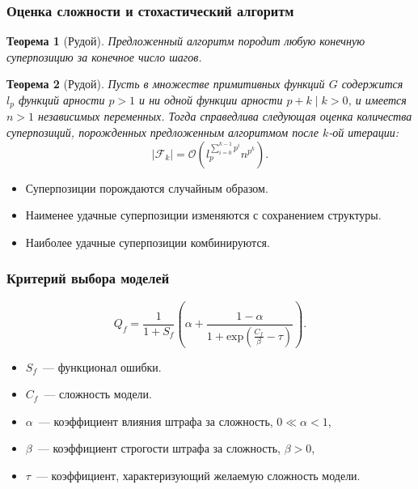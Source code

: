 \documentclass{beamer}
\newtheorem{theo}{Теорема}
\begin{document}
\begin{frame}
  \frametitle{Оценка сложности и стохастический алгоритм}
  
  \begin{theo}[Рудой]
	Предложенный алгоритм породит любую конечную суперпозицию за конечное число шагов.
  \end{theo}

  \begin{theo}[Рудой]
	Пусть в множестве примитивных функций $G$ содержится $l_p$ функций арности
	$p > 1$ и ни одной функции арности $p + k \mid k > 0$, и имеется $n > 1$
	независимых переменных. Тогда справедлива следующая оценка количества
	суперпозиций, порожденных предложенным алгоритмом после $k$-ой итерации:
	\[
	| \mathcal{F}_k | = \mathcal{O} (l_p^{\sum_{i=0}^{k-1} p^i} n^{p^k}).
	\]
  \end{theo}

  \begin{itemize}
	\item Суперпозиции порождаются случайным образом.
	\item Наименее удачные суперпозиции изменяются с сохранением структуры.
	\item Наиболее удачные суперпозиции комбинируются.
  \end{itemize}
\end{frame}

\begin{frame}
  \frametitle{Критерий выбора моделей}

  \[
  Q_f = \frac{1}{1 + S_f} \left(\alpha + \frac{1 - \alpha}{1 + \text{exp} (\frac{C_f}{\beta} - \tau)}\right).
  \]
  \begin{itemize}
	\item $S_f$~--- функционал ошибки.
	\item $C_f$~--- сложность модели.
	\item $\alpha$~--- коэффициент влияния штрафа за сложность, $0 \ll \alpha < 1$,
	\item $\beta$~--- коэффициент строгости штрафа за сложность, $\beta > 0$,
	\item $\tau$~--- коэффициент, характеризующий желаемую сложность модели.
  \end{itemize}
\end{frame}
\end{document}

